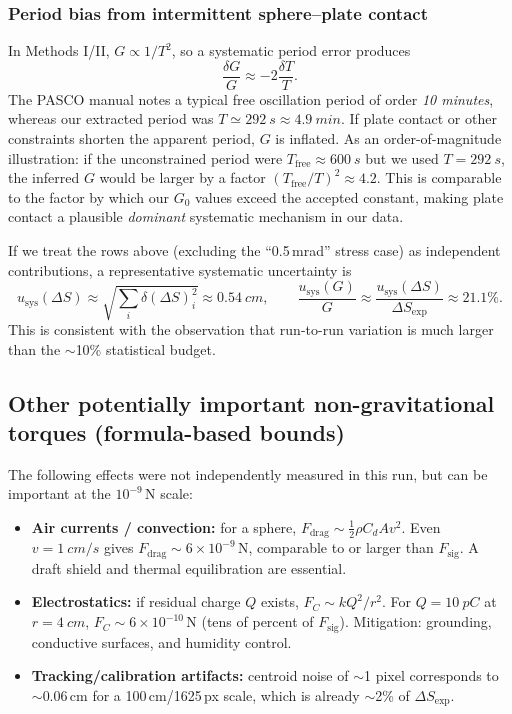 \documentclass[11pt]{article}
\begin{document}
\subsubsection*{Period bias from intermittent sphere--plate contact}\label{sec:sys_period}
In Methods I/II, $G\propto 1/T^2$, so a systematic period error produces
\[
\frac{\delta G}{G}\approx -2\frac{\delta T}{T}.
\]
The PASCO manual notes a typical free oscillation period of order \emph{10 minutes}, whereas our extracted period was $T\simeq\SI{292}{s}\approx \SI{4.9}{min}$.
If plate contact or other constraints shorten the apparent period, $G$ is inflated.
As an order-of-magnitude illustration: if the unconstrained period were $T_{\mathrm{free}}\approx\SI{600}{s}$ but we used $T=\SI{292}{s}$, the inferred $G$ would be larger by a factor $(T_{\mathrm{free}}/T)^2\approx 4.2$.
This is comparable to the factor by which our $G_0$ values exceed the accepted constant, making plate contact a plausible \emph{dominant} systematic mechanism in our data.



If we treat the rows above (excluding the ``0.5\,mrad'' stress case) as independent contributions, a representative systematic uncertainty is
\[
u_{\mathrm{sys}}(\Delta S)\approx \sqrt{\sum_i \delta(\Delta S)_i^2} \approx \SI{0.54}{cm},
\qquad
\frac{u_{\mathrm{sys}}(G)}{G}\approx \frac{u_{\mathrm{sys}}(\Delta S)}{\Delta S_{\mathrm{exp}}}\approx 21.1\%.
\]
This is consistent with the observation that run-to-run variation is much larger than the $\sim$10\% statistical budget.

\subsection*{Other potentially important non-gravitational torques (formula-based bounds)}
The following effects were not independently measured in this run, but can be important at the $10^{-9}$\,N scale:
\begin{itemize}[itemsep=3pt]
\item \textbf{Air currents / convection:} for a sphere, $F_{\mathrm{drag}}\sim \tfrac{1}{2}\rho C_d A v^2$. Even $v=\SI{1}{cm/s}$ gives $F_{\mathrm{drag}}\sim 6\times10^{-9}$\,N, comparable to or larger than $F_{\mathrm{sig}}$. A draft shield and thermal equilibration are essential.
\item \textbf{Electrostatics:} if residual charge $Q$ exists, $F_C \sim k Q^2/r^2$. For $Q=\SI{10}{pC}$ at $r=\SI{4}{cm}$, $F_C\sim 6\times10^{-10}$\,N (tens of percent of $F_{\mathrm{sig}}$). Mitigation: grounding, conductive surfaces, and humidity control.
\item \textbf{Tracking/calibration artifacts:} centroid noise of $\sim$1 pixel corresponds to $\sim$0.06\,cm for a 100\,cm/1625\,px scale, which is already $\sim$2\% of $\Delta S_{\mathrm{exp}}$.
\end{itemize}
\end{document}
